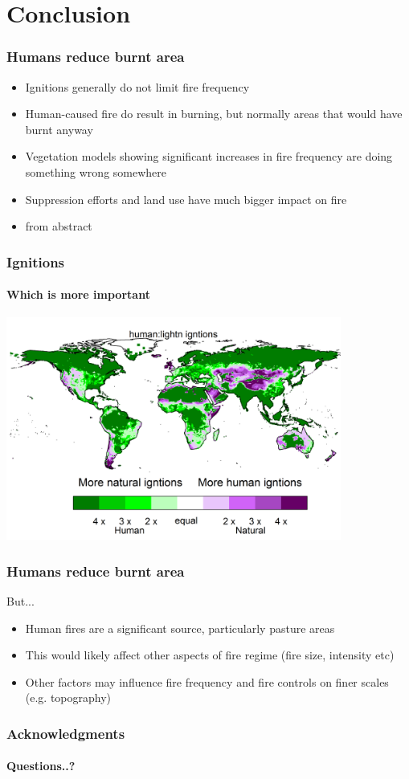 \section{Conclusion}


\begin{frame}
    \frametitle{Humans reduce burnt area}
	\begin{itemize}
		\item Ignitions generally do not limit fire frequency
		\item Human-caused fire do result in burning, but normally areas that would have burnt anyway
		\item Vegetation models showing significant increases in fire frequency are doing something wrong somewhere
		\item Suppression efforts and land use have much bigger impact on fire
		\item from abstract
	\end{itemize}
\end{frame}

\begin{frame}
	\frametitle{Ignitions}
	\framesubtitle{Which is more important}
	\includegraphics[width=11.0cm]{images/igntitions/IgntionInfosourceImportance}
	
\end{frame}

\begin{frame}
    \frametitle{Humans reduce burnt area}
	\large{But...}
	\begin{itemize}
		\item Human fires are a significant source, particularly pasture areas
		\item This would likely affect other aspects of fire regime (fire size, intensity etc)
		\item Other factors may influence fire frequency and fire controls on finer scales (e.g. topography)
	\end{itemize}
\end{frame}

\begin{frame}
    \frametitle{Acknowledgments}
    \framesubtitle{Questions..?}
\end{frame}
